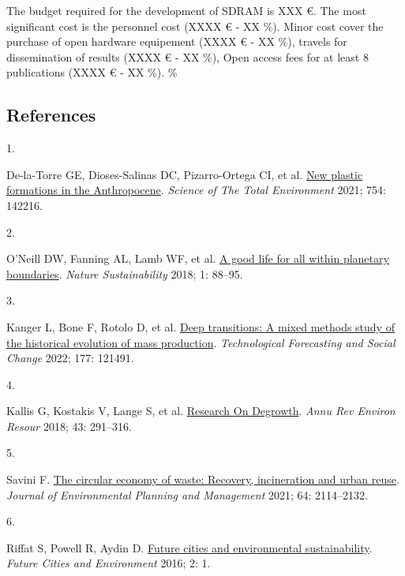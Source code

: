 \documentclass[
  11pt,
  a4paperpaper,
  onecolumn]{article}
\newlength{\cslhangindent}
\newlength{\csllabelwidth}
\newlength{\cslentryspacingunit} %
\newenvironment{CSLReferences}[2] %
 {%
  \setlength{\parindent}{0pt}
  \ifodd #1
  \let\oldpar\par
  \def\par{\hangindent=\cslhangindent\oldpar}
  \fi
  \setlength{\parskip}{#2\cslentryspacingunit}
 }%
 {}
\newcommand{\CSLLeftMargin}[1]{\parbox[t]{\csllabelwidth}{#1}}
\newcommand{\CSLRightInline}[1]{\parbox[t]{\linewidth - \csllabelwidth}{#1}\break}
\begin{document}
The budget required for the development of SDRAM is XXX €. The most
significant cost is the personnel cost (XXXX € - XX \%). Minor cost
cover the purchase of open hardware equipement (XXXX € - XX \%), travels
for dissemination of results (XXXX € - XX \%), Open access fees for at
least 8 publications (XXXX € - XX \%). \%

\newpage

\hypertarget{references}{%
\subsection*{References}\label{references}}

\hypertarget{refs}{}
\begin{CSLReferences}{0}{0}
\leavevmode{}%
\CSLLeftMargin{1. }%
\CSLRightInline{De-la-Torre GE, Dioses-Salinas DC, Pizarro-Ortega CI, et
al. \href{https://doi.org/10.1016/j.scitotenv.2020.142216}{New plastic
formations in the {Anthropocene}}. \emph{Science of The Total
Environment} 2021; 754: 142216.}

\leavevmode{}%
\CSLLeftMargin{2. }%
\CSLRightInline{O'Neill DW, Fanning AL, Lamb WF, et al.
\href{https://doi.org/10.1038/s41893-018-0021-4}{A good life for all
within planetary boundaries}. \emph{Nature Sustainability} 2018; 1:
88--95.}

\leavevmode{}%
\CSLLeftMargin{3. }%
\CSLRightInline{Kanger L, Bone F, Rotolo D, et al.
\href{https://doi.org/10.1016/J.TECHFORE.2022.121491}{Deep transitions:
{A} mixed methods study of the historical evolution of mass production}.
\emph{Technological Forecasting and Social Change} 2022; 177: 121491.}

\leavevmode{}%
\CSLLeftMargin{4. }%
\CSLRightInline{Kallis G, Kostakis V, Lange S, et al.
\href{https://doi.org/10.1146/annurev-environ-102017-025941}{Research
{On Degrowth}}. \emph{Annu Rev Environ Resour} 2018; 43: 291--316.}

\leavevmode{}%
\CSLLeftMargin{5. }%
\CSLRightInline{Savini F.
\href{https://doi.org/10.1080/09640568.2020.1857226}{The circular
economy of waste: Recovery, incineration and urban reuse}. \emph{Journal
of Environmental Planning and Management} 2021; 64: 2114--2132.}

\leavevmode{}%
\CSLLeftMargin{6. }%
\CSLRightInline{Riffat S, Powell R, Aydin D.
\href{https://doi.org/10.1186/s40984-016-0014-2}{Future cities and
environmental sustainability}. \emph{Future Cities and Environment}
2016; 2: 1.}


\end{CSLReferences}
\end{document}
